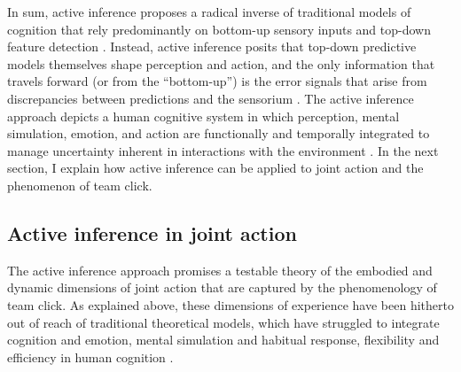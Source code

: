 \begin{CJK}{UTF8}{gbsn}
In sum, active inference \citep[and the predictive coding paradigm which it extends, see][]{Clark2013} proposes a radical inverse of traditional models of cognition that rely predominantly on bottom-up sensory inputs and top-down feature detection \citep{Marr1985}. Instead, active inference posits that top-down predictive models themselves shape perception and action, and the only information that travels forward (or from the ``bottom-up'') is the error signals that arise from discrepancies between predictions and the sensorium \citep{Pickering2014}.  The active inference approach depicts a human cognitive system in which perception, mental simulation, emotion, and action are functionally and temporally integrated to manage uncertainty inherent in interactions with the environment \citep{Clark2013}.  In the next section, I explain how active inference can be applied to joint action and the phenomenon of team click.


\subsection{Active inference in joint action \label{sect:activeInfJA}}

The active inference approach promises a testable theory of the embodied and dynamic dimensions of joint action that are captured by the phenomenology of team click.  As explained above, these dimensions of experience have been hitherto out of reach of traditional theoretical models, which have struggled to integrate cognition and emotion, mental simulation and habitual response, flexibility and efficiency in human cognition \citep{Clark2015}.


\end{CJK}

